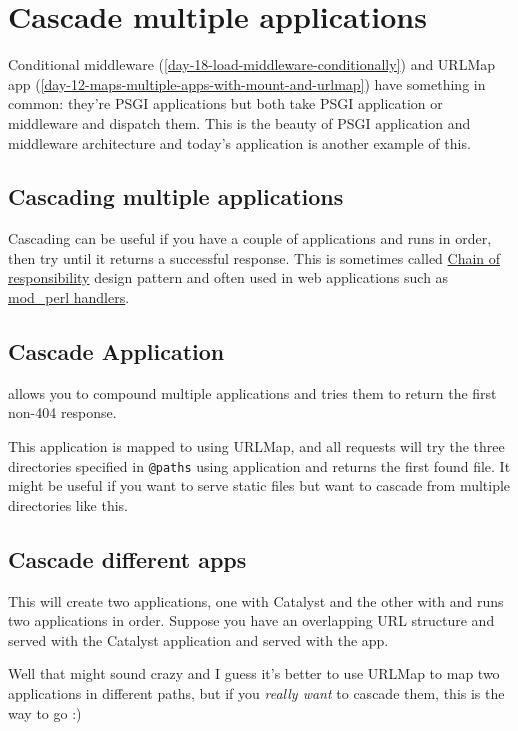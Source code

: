 \chapter{Cascade multiple applications}
\label{day-19-cascade-multiple-applications}

Conditional middleware (\autoref{day-18-load-middleware-conditionally}) and
URLMap app (\autoref{day-12-maps-multiple-apps-with-mount-and-urlmap})
have something in common: they're PSGI applications but both take
PSGI application or middleware and dispatch them. This is the beauty of
PSGI application and middleware architecture and today's application is
another example of this.

\section{Cascading multiple
applications}\label{cascading-multiple-applications}

Cascading can be useful if you have a couple of applications and runs in
order, then try until it returns a successful response. This is
sometimes called
\href{http://en.wikipedia.org/wiki/Chain-of-responsibility_pattern}{Chain
of responsibility} design pattern and often used in web applications
such as
\href{http://perl.apache.org/docs/2.0/user/handlers/intro.html}{mod\_perl
handlers}.

\section{Cascade Application}\label{cascade-application}

 allows you to compound multiple applications and
tries them to return the first non-404 response.


This application is mapped to  using URLMap, and all
requests will try the three directories specified in \lstinline!@paths!
using  application and returns the first found file. It might
be useful if you want to serve static files but want to cascade from
multiple directories like this.

\section{Cascade different apps}\label{cascade-different-apps}


This will create two applications, one with Catalyst and the other with
 and runs two applications in order. Suppose you have an
overlapping URL structure and  served with the
Catalyst application and  served with the
 app.

Well that might sound crazy and I guess it's better to use URLMap to map
two applications in different paths, but if you \emph{really want} to
cascade them, this is the way to go :)

